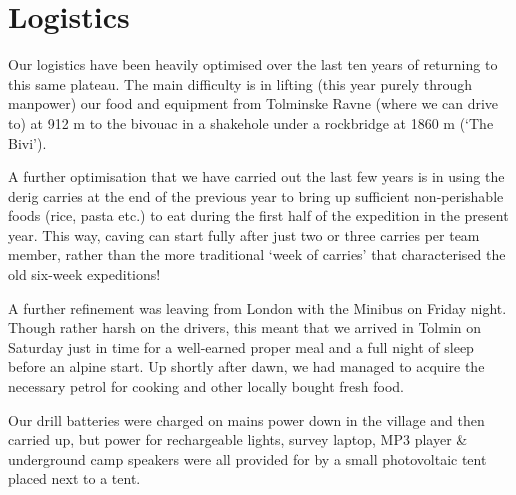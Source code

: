 
\section{Logistics}

Our logistics have been heavily optimised over the last ten years of
returning to this same plateau. The main difficulty is in lifting (this
year purely through manpower) our food and equipment from Tolminske
Ravne (where we can drive to) at 912 m to the bivouac in a shakehole
under a rockbridge at 1860 m (`The Bivi').

A further optimisation that we have carried out the last few years is in
using the derig carries at the end of the previous year to bring up
sufficient non-perishable foods (rice, pasta etc.) to eat during the
first half of the expedition in the present year. This way, caving can
start fully after just two or three carries per team member, rather than
the more traditional `week of carries' that characterised the old
six-week expeditions!

A further refinement was leaving from London with the Minibus on Friday
night. Though rather harsh on the drivers, this meant that we arrived in
Tolmin on Saturday just in time for a well-earned proper meal and a full
night of sleep before an alpine start. Up shortly after dawn, we had
managed to acquire the necessary petrol for cooking and other locally
bought fresh food.

Our drill batteries were charged on mains power down in the village and
then carried up, but power for rechargeable lights, survey laptop, MP3
player \& underground camp speakers were all provided for by a small
photovoltaic tent placed next to a tent.
